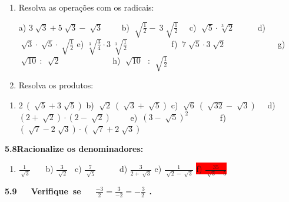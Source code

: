 \documentclass[12pt]{article}
\renewcommand{\_}{\kern-1.5pt\textunderscore\kern-1.5pt}
\begin{document}
\begin{enumerate}
	\item Resolva as operações com os radicais:\par

a)  \( 3\sqrt[]{3}+5\sqrt[]{3}-\sqrt[]{3} \) \  \tab \ \ \  b)  \( \sqrt[]{\frac{1}{2}}-~3  \sqrt[]{\frac{1}{2}} \) \tab \ \  c)  \( \sqrt[]{5}  \cdot  \sqrt[3]{2} \) \tab \ \ \ \ \  d)  \( \sqrt[]{3}  \cdot  \sqrt[]{5} \cdot \sqrt[]{\frac{1}{2}} \)  e)  \( \sqrt[3]{\frac{3}{4}} \cdot 3~ \sqrt[3]{\frac{1}{2}} \) \ \ \ \  \tab \ \ \ \ \ \  f)  \( ~7\sqrt[]{5}  \cdot  3\sqrt[]{2} \) \ \ \ \ \ \ \ \ \ \ \ \  g)  \( \sqrt[]{10}~:~\sqrt[]{2} \) \ \ \ \ \ \ \ \ \ \ \ \  h)  \( \sqrt[]{10}\text{~ : }\sqrt[]{\frac{1}{2}} \) \par

	\item Resolva os produtos:
\end{enumerate}\par

\begin{enumerate}
	\item  \( 2~ \left( \sqrt[]{5}+3\sqrt[]{5} \right)  \) \tab \tab \tab b)  \( \sqrt[]{2}~ \left( \sqrt[]{3}+\sqrt[]{5} \right)  \) \tab \tab c)  \( \sqrt[]{6}~ \left( \sqrt[]{32}-\sqrt[]{3} \right)  \) \ \  d)  \(  \left( 2+\sqrt[]{2} \right)  \cdot  \left( 2-\sqrt[]{2} \right)  \) \ \ \ \  \tab e)\   \(  \left( 3-\sqrt[]{5} \right) ^{2} \) \ \ \ \ \ \ \  f)  \(  \left( \sqrt[]{7}-2\sqrt[]{3} \right)  \cdot  \left( \sqrt[]{7}+2\sqrt[]{3} \right)  \) \tab \tab 
\end{enumerate}\par

\begin{adjustwidth}{0.3in}{0.0in}
\textbf{5.8\tab  Racionalize os denominadores:}\par

\end{adjustwidth}

\begin{enumerate}
	\item  \( \frac{1}{\sqrt[]{3}} \) \tab \ \ \  b)  \( \frac{3}{\sqrt[]{2}} \) \tab \  c)  \( \frac{7}{\sqrt[]{5}} \) \tab \ \ \ \ \  \tab d)  \( \frac{3}{2+\sqrt[]{3}} \) \tab \tab e)  \( \frac{1}{\sqrt[]{2}-\sqrt[]{3}} \) \tab \colorbox{Red}{f)  \( \frac{35}{\sqrt[]{3}-5} \) }
\end{enumerate}\par

\textbf{5.9\ \ \  Verifique\ se\ \ \    \( \frac{-3}{2}=\frac{3}{-2}=-\frac{3}{2~} \) .}\par
\end{document}
